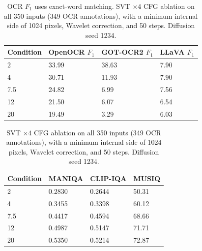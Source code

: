 \begin{table}[H]
\centering
\caption{OCR $F_1$ uses exact-word matching. SVT $\times4$ CFG ablation on all 350 inputs (349 OCR annotations), with a minimum internal side of 1024 pixels, Wavelet correction, and 50 steps. Diffusion seed 1234.}
\label{tab:ar-svt-cfg-ocr}
\small
\setlength{\tabcolsep}{4pt}
\begin{tabular}{llll}
\toprule
Condition & OpenOCR $F_1$ & GOT-OCR2 $F_1$ & LLaVA $F_1$ \\
\midrule
2 & 33.99 & 38.63 & 7.90 \\
4 & 30.71 & 11.93 & 7.90 \\
7.5 & 24.82 & 6.99 & 7.56 \\
12 & 21.50 & 6.07 & 6.54 \\
20 & 19.49 & 3.29 & 6.03 \\
\bottomrule
\end{tabular}
\end{table}

\begin{table}[H]
\centering
\caption{SVT $\times4$ CFG ablation on all 350 inputs (349 OCR annotations), with a minimum internal side of 1024 pixels, Wavelet correction, and 50 steps. Diffusion seed 1234.}
\label{tab:ar-svt-cfg-iqa}
\small
\setlength{\tabcolsep}{4pt}
\begin{tabular}{llll}
\toprule
Condition & MANIQA & CLIP-IQA & MUSIQ \\
\midrule
2 & 0.2830 & 0.2644 & 50.31 \\
4 & 0.3455 & 0.3398 & 60.12 \\
7.5 & 0.4417 & 0.4594 & 68.66 \\
12 & 0.4987 & 0.5147 & 71.71 \\
20 & 0.5350 & 0.5214 & 72.87 \\
\bottomrule
\end{tabular}
\end{table}
